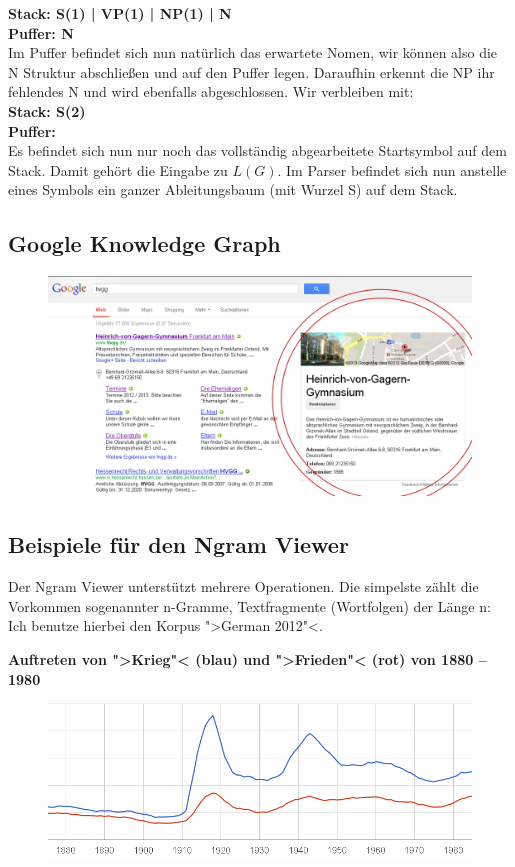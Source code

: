 \documentclass[12pt,a4paper]{article}
\theoremstyle{definition}
\begin{document}
		\textbf{Stack: S(1) | VP(1) | NP(1) | N\\
				Puffer: N\\
		}
		Im Puffer befindet sich nun natürlich das erwartete Nomen, wir können also die N Struktur abschließen und auf den Puffer legen. Daraufhin erkennt die NP ihr fehlendes N und wird ebenfalls abgeschlossen. Wir verbleiben mit:\\
		
		\textbf{Stack: S(2)\\
				Puffer:\\
		}
		Es befindet sich nun nur noch das vollständig abgearbeitete Startsymbol auf dem Stack. Damit gehört die Eingabe zu $L(G)$. Im Parser befindet sich nun anstelle eines Symbols ein ganzer Ableitungsbaum (mit Wurzel S) auf dem Stack.
		
	\subsection{Google Knowledge Graph}
		\begin{figure}[hbtp]
		\centering
		\includegraphics[width=\linewidth]{Grafiken/Google-Knowledge-Graph}
		\end{figure}
		
		\newpage

	\subsection{Beispiele für den Ngram Viewer}
		Der Ngram Viewer unterstützt mehrere Operationen. Die simpelste zählt die Vorkommen sogenannter n-Gramme, Textfragmente (Wortfolgen) der Länge n:
		Ich benutze hierbei den Korpus ">German 2012"<.
		
		\textbf{Auftreten von ">Krieg"< (blau) und ">Frieden"< (rot) von 1880 – 1980}
		\begin{figure}[hbtp]
		\centering
		\includegraphics[width=\linewidth]{Grafiken/Krieg-vs-Frieden}
		\end{figure}
		
\end{document}
